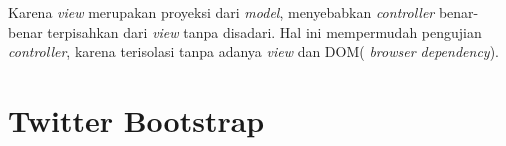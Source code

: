		Karena \textit{view} merupakan proyeksi dari \textit{model}, menyebabkan \textit{controller} benar-benar terpisahkan dari \textit{view} tanpa disadari. Hal ini mempermudah pengujian \textit{controller}, karena terisolasi tanpa adanya \textit{view} dan DOM( \textit{browser dependency}).
		
\section{Twitter Bootstrap}
\label{sec: Bootrstrap}

		
